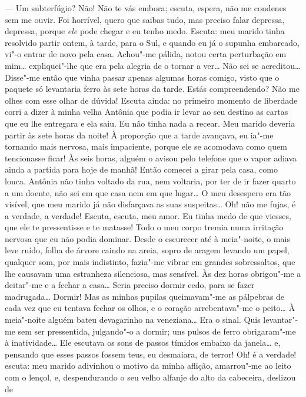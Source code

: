 --- Um subterfúgio? Não! Não te vás embora; escuta, espera, não me
condenes sem me ouvir. Foi horrível, quero que saibas tudo, mas preciso
falar depressa, depressa, porque \emph{ele} pode chegar e eu tenho medo.
Escuta: meu marido tinha resolvido partir ontem, à tarde, para o Sul, e
quando eu já o supunha embarcado, vi"-o entrar de novo pela casa.
Achou"-me pálida, notou certa perturbação em mim\ldots{} expliquei"-lhe que
era pela alegria de o tornar a ver\ldots{} Não sei se acreditou\ldots{} Disse"-me
então que vinha passar apenas algumas horas comigo, visto que o paquete
só levantaria ferro às sete horas da tarde. Estás compreendendo? Não me
olhes com esse olhar de dúvida! Escuta ainda: no primeiro momento de
liberdade corri a dizer à minha velha Antônia que podia ir levar ao seu
destino as cartas que eu lhe entregara e ela saiu. Eu não tinha nada a
recear. Meu marido deveria partir às sete horas da noite! À proporção
que a tarde avançava, eu ia"-me tornando mais nervosa, mais impaciente,
porque ele se acomodava como quem tencionasse ficar! Às seis horas,
alguém o avisou pelo telefone que o vapor adiava ainda a partida para
hoje de manhã! Então comecei a girar pela casa, como louca. Antônia não
tinha voltado da rua, nem voltaria, por ter de ir fazer quarto a um
doente, não sei em que casa nem em que lugar\ldots{} O meu desespero era tão
visível, que meu marido já não disfarçava as suas suspeitas\ldots{} Oh! não
me fujas, é a verdade, a verdade! Escuta, escuta, meu amor. Eu tinha
medo de que viesses, que ele te pressentisse e te matasse! Todo o meu
corpo tremia numa irritação nervosa que eu não podia dominar. Desde o
escurecer até à meia"-noite, o mais leve ruído, folha de árvore caindo na
areia, sopro de aragem levando um papel, qualquer som, por mais
indistinto, fazia"-me vibrar em grandes sobressaltos, que lhe causavam
uma estranheza silenciosa, mas sensível. Às dez horas obrigou"-me a
deitar"-me e a fechar a casa\ldots{} Seria preciso dormir cedo, para se fazer
madrugada\ldots{} Dormir! Mas as minhas pupilas queimavam"-me as pálpebras de
cada vez que eu tentava fechar os olhos, e o coração arrebentava"-me o
peito\ldots{} À meia"-noite alguém bateu devagarinho na veneziana\ldots{} Era o
sinal. Quis levantar"-me sem ser pressentida, julgando"-o a dormir; uns
pulsos de ferro obrigaram"-me à inatividade\ldots{} Ele escutava os sons de
passos tímidos embaixo da janela\ldots{} e, pensando que esses passos fossem
teus, eu desmaiara, de terror! Oh! é a verdade! escuta: meu marido
adivinhou o motivo da minha aflição, amarrou"-me ao leito com o lençol,
e, despendurando o seu velho alfanje do alto da cabeceira, deslizou de
